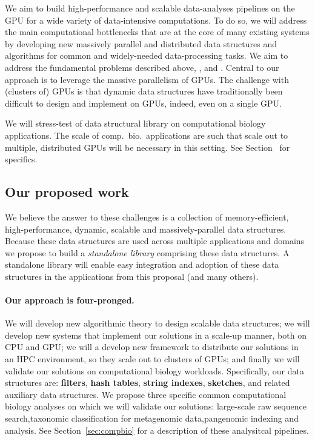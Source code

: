 %

 We aim to build high-performance and scalable data-analyses pipelines on the GPU for a wide variety of data-intensive computations.  To do so, we will address the main computational bottlenecks that are at the core of many existing systems by developing new massively parallel and distributed data structures and algorithms for common and widely-needed data-processing tasks. We aim to address the fundamental problems described above, , and .    
%
Central to our approach is to leverage the massive parallelism of GPUs. The challenge with (clusters of) GPUs  is that dynamic data structures have traditionally  been difficult to design and implement on GPUs, indeed, even on a single GPU. 

We will stress-test of data structural library on computational biology applications. The scale of comp.~bio.~applications are such that scale out to multiple, distributed GPUs will be necessary in this setting.
See Section~ for specifics.  




\subsection{Our proposed work}

We believe the answer to these challenges is a collection of  memory-efficient, high-performance, dynamic, scalable and massively-parallel data structures.
Because these data structures are used across multiple applications and domains we propose to build a \emph{standalone library} comprising these data structures. A standalone library will enable easy integration and adoption of these data structures in the applications from this proposal (and many others).

\paragraph{Our approach is four-pronged.}  We will develop new {algorithmic theory} to design scalable data structures; we will develop new {systems} that implement our solutions in a scale-up manner,  both on CPU and GPU\@; we will a develop new framework to distribute our solutions in an {HPC} environment, so they scale out to clusters of GPUs; and finally we will validate our solutions on {computational biology} workloads.
%
Specifically, our data structures are: \textbf{filters}, \textbf{hash tables}, \textbf{string indexes}, \textbf{sketches}, and related auxiliary data structures.  We propose three specific common computational biology analyses on which we will validate our solutions: {large-scale raw sequence search},{taxonomic classification for metagenomic data},{pangenomic indexing and analysis}.   See Section~\ref{sec:compbio} for a description of these analysitcal pipelines.

